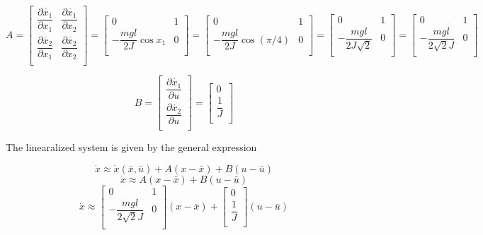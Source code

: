 \documentclass[11pt]{article}
\begin{document}
\[
    A =
    \begin{bmatrix}
        \dfrac{\partial \dot{x_1}}{\partial x_1} & \dfrac{\partial \dot{x_1}}{\partial x_2} \\
        \dfrac{\partial \dot{x_2}}{\partial x_1} & \dfrac{\partial \dot{x_2}}{\partial x_2} \\
    \end{bmatrix}
    = \begin{bmatrix}
        0 & 1 \\
        - \dfrac{mgl}{2J} \cos x_1 & 0 \\
    \end{bmatrix}
    = \begin{bmatrix}
        0 & 1 \\
        - \dfrac{mgl}{2J} \cos (\pi / 4) & 0 \\
    \end{bmatrix}
    = \begin{bmatrix}
        0 & 1 \\
        - \dfrac{mgl}{2J \sqrt 2} & 0 \\
    \end{bmatrix}
    = \begin{bmatrix}
        0 & 1 \\
        - \dfrac{mgl}{2 \sqrt 2 J} & 0 \\
    \end{bmatrix}
\]

\[
    B =
    \begin{bmatrix}
        \dfrac{\partial \dot{x_1}}{\partial u} \\
        \dfrac{\partial \dot{x_2}}{\partial u} \\
    \end{bmatrix}
    = \begin{bmatrix}
        0 \\
        \dfrac{1}{J} \\
    \end{bmatrix}
\]

The linearalized  system is given by the general expression

\[ \dot{x} \approx \dot{x}(\bar{x}, \bar{u}) + A (x - \bar{x}) + B (u - \bar{u}) \]
\[ \dot{x} \approx A(x - \bar{x}) + B (u - \bar{u}) \]
\[
    \dot{x} \approx
    \begin{bmatrix}
        0 & 1 \\
        - \dfrac{mgl}{2 \sqrt 2 J} & 0 \\
    \end{bmatrix}
    (x - \bar{x}) +
    \begin{bmatrix}
        0 \\
        \dfrac{1}{J} \\
    \end{bmatrix}
    (u - \bar{u})
\]
\end{document}
